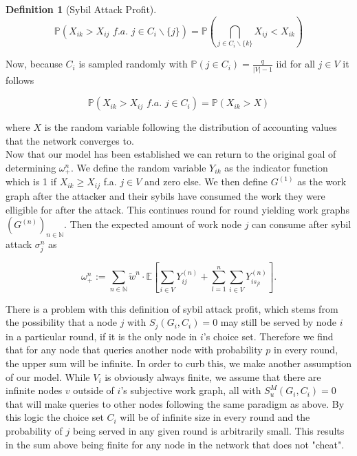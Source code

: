 \documentclass[11pt,a4paper]{article}
\theoremstyle{definition}
\newtheorem{definition}{Definition}[section]
\theoremstyle{theorem}
\theoremstyle{proposition}
\theoremstyle{corollary}
\theoremstyle{lemma}
\theoremstyle{example}
\theoremstyle{remark}
\begin{document}
\begin{definition}[Sybil Attack Profit]
\[
\mathbb{P}(X_{ik}>X_{ij}\,\,\textit{f.a. }j\in{}C_i\backslash\lbrace{}j\rbrace) = \mathbb{P}\left(\bigcap\limits_{j\in{}C_i\backslash\lbrace{}k\rbrace}X_{ij}<{}X_{ik}\right)
\]

\noindent{}Now, because $C_i$ is sampled randomly with $\mathbb{P}(j\in{}C_i)=\frac{q}{|V|-1}$ iid for all $j\in{}V$ it follows 

\[
\mathbb{P}(X_{ik}>X_{ij}\,\,\textit{f.a.}\,\,j\in{}C_i) = \mathbb{P}(X_{ik}>X)
\]

\noindent{}where $X$ is the random variable following the distribution of accounting values that the network converges to. \vspace{1em}\\

\noindent{}Now that our model has been established we can return to the original goal of determining $\omega_{+}^{n}$. We define the random variable $Y_{ik}$ as the indicator function which is 1 if $X_{ik}\geq{}X_{ij}$ f.a. $j\in{}V$ and zero else. We then define $G^{(1)}$ as the work graph after the attacker and their sybils have consumed the work they were elligible for after the attack. This continues round for round yielding work graphs $\left(G^{(n)}\right)_{n\in\mathbb{N}}$. Then the expected amount of work node $j$ can consume after sybil attack $\sigma_j^n$ as 

\[
\omega^n_{+}:=\sum\limits_{n\in\mathbb{N}}\tilde{w}^n\cdot\mathbb{E}\left[\sum\limits_{i\in{}V}Y^{(n)}_{ij}+\sum\limits_{l=1}^{n}\sum\limits_{i\in{}V}Y^{(n)}_{is_{jl}}\right].
\]

\noindent{}There is a problem with this definition of sybil attack profit, which stems from the possibility that a node $j$ with $S_j(G_i,C_i)=0$ may still be served by node $i$ in a particular round, if it is the only node in $i$'s choice set. Therefore we find that for any node that queries another node with probability $p$ in every round, the upper sum will be infinite. In order to curb this, we make another assumption of our model. While $V_i$ is obviously always finite, we assume that there are infinite nodes $v$ outside of $i$'s subjective work graph, all with $S^M_u(G_i,C_i)=0$ that will make queries to other nodes following the same paradigm as above. By this logic the choice set $C_i$ will be of infinite size in every round and the probability of $j$ being served in any given round is arbitrarily small. This results in the sum above being finite for any node in the network that does not "cheat". \vspace{1em}\\ 


\end{definition}
\end{document}
